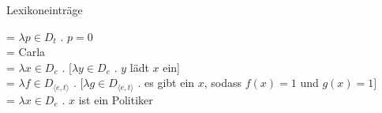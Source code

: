 \begin{exe}
    \ex Lexikoneinträge
    
     = $\lambda p \in D_t$ . $p=0$\\
         = Carla\\
         = $\lambda x \in D_e$ . [$\lambda y \in D_e$ . $y$ lädt $x$ ein]\\
         = $\lambda f \in D_{\langle e, t\rangle}$ . $[\lambda g \in D_{\langle e, t\rangle}$ . es gibt ein $x$, sodass $f(x)=1$ und $g(x)=1]$\\
         = $\lambda x \in D_e$ . $x$ ist ein Politiker
\end{exe}
